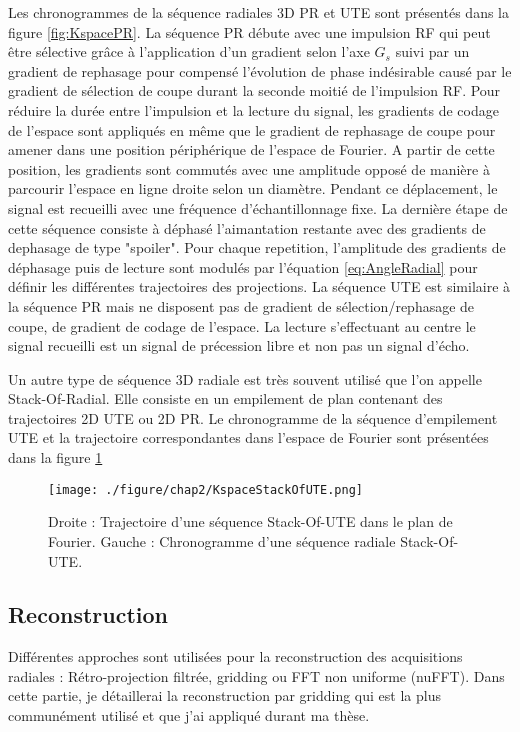 Les chronogrammes de la séquence radiales 3D PR et UTE sont présentés dans la figure \ref{fig:KspacePR}. La séquence PR débute avec une impulsion RF qui peut être sélective grâce à l'application d'un  gradient selon l'axe $G_s$ suivi par un gradient de rephasage pour compensé l'évolution de phase indésirable causé par le gradient de sélection de coupe durant la seconde moitié de l'impulsion RF. Pour réduire la durée entre l'impulsion et la lecture du signal, les gradients de codage de l'espace sont appliqués en même que le gradient de rephasage de coupe pour amener dans une position périphérique de l'espace de Fourier. A partir de cette position, les gradients sont commutés avec une amplitude opposé de manière à parcourir l'espace en ligne droite selon un diamètre. Pendant ce déplacement, le signal est recueilli avec une fréquence d'échantillonnage fixe. La dernière étape de cette séquence consiste à déphasé l'aimantation restante avec des gradients de dephasage de type "spoiler". Pour chaque repetition, l'amplitude des gradients de déphasage puis de lecture sont modulés par l'équation \ref{eq:AngleRadial} pour définir les différentes trajectoires des projections.
La séquence UTE est similaire à la séquence PR mais ne disposent pas 
de gradient de sélection/rephasage de coupe, de gradient de codage de l'espace. La lecture s'effectuant au centre le signal recueilli est un signal de précession libre et non pas un signal d'écho.

Un autre type de séquence 3D radiale est très souvent utilisé que l'on appelle Stack-Of-Radial. Elle consiste en un empilement de plan contenant des trajectoires 2D UTE ou 2D PR. Le chronogramme de la séquence d'empilement UTE et la trajectoire correspondantes dans l'espace de Fourier sont présentées dans la figure \ref{fig:KspaceStackOfUTE}

\begin{figure}[H]
\centering
\texttt{[image: ./figure/chap2/KspaceStackOfUTE.png]}
\caption[Coordonnées sphériques]{\label{fig:KspaceStackOfUTE} Droite : Trajectoire d'une séquence Stack-Of-UTE dans le plan de Fourier. Gauche : Chronogramme d'une séquence radiale Stack-Of-UTE.} 
\end{figure}

\subsection{Reconstruction}

\label{subsec:reconstruction}
Différentes approches sont utilisées pour la reconstruction des acquisitions radiales : Rétro-projection filtrée, gridding ou FFT non uniforme (nuFFT). Dans cette partie, je détaillerai la reconstruction par gridding qui est la plus communément utilisé et que j'ai appliqué durant ma thèse.

